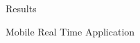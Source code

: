 \documentclass[final]{beamer}
\begin{document}
\begin{frame}{}
\begin{columns}[t]
\begin{column}{.48\linewidth}
\begin{block}{Results}
% 
% 		 
        \end{block}
        
        \begin{block}{Mobile Real Time Application}
	

\end{block}
\end{column}
\end{columns}
\end{frame}
\end{document}
